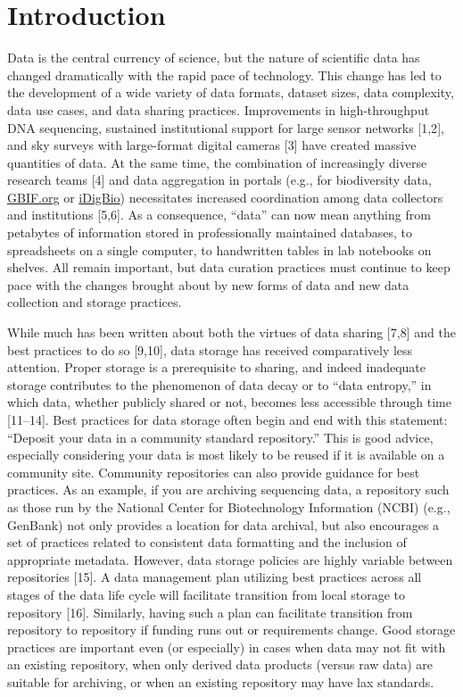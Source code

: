 \documentclass[10pt,letterpaper]{article}
\begin{document}
\section*{Introduction}\label{introduction}

Data is the central currency of science, but the nature of scientific
data has changed dramatically with the rapid pace of technology. This
change has led to the development of a wide variety of data formats,
dataset sizes, data complexity, data use cases, and data sharing
practices. Improvements in high-throughput DNA sequencing, sustained
institutional support for large sensor networks {[}1,2{]}, and sky
surveys with large-format digital cameras {[}3{]} have created massive
quantities of data. At the same time, the combination of increasingly
diverse research teams {[}4{]} and data aggregation in portals (e.g.,
for biodiversity data, \href{http://gbif.org/}{GBIF.org} or
\href{https://www.idigbio.org/portal/}{iDigBio}) necessitates increased
coordination among data collectors and institutions {[}5,6{]}. As a
consequence, ``data'' can now mean anything from petabytes of
information stored in professionally maintained databases, to
spreadsheets on a single computer, to handwritten tables in lab
notebooks on shelves. All remain important, but data curation practices
must continue to keep pace with the changes brought about by new forms
of data and new data collection and storage practices.

While much has been written about both the virtues of data sharing
{[}7,8{]} and the best practices to do so {[}9,10{]}, data storage has
received comparatively less attention. Proper storage is a prerequisite
to sharing, and indeed inadequate storage contributes to the phenomenon
of data decay or to ``data entropy,'' in which data, whether publicly
shared or not, becomes less accessible through time {[}11--14{]}. Best
practices for data storage often begin and end with this statement:
``Deposit your data in a community standard repository.'' This is good
advice, especially considering your data is most likely to be reused if
it is available on a community site. Community repositories can also
provide guidance for best practices. As an example, if you are archiving
sequencing data, a repository such as those run by the National Center
for Biotechnology Information (NCBI) (e.g., GenBank) not only provides a
location for data archival, but also encourages a set of practices
related to consistent data formatting and the inclusion of appropriate
metadata. However, data storage policies are highly variable between
repositories {[}15{]}. A data management plan utilizing best practices
across all stages of the data life cycle will facilitate transition from
local storage to repository {[}16{]}. Similarly, having such a plan can
facilitate transition from repository to repository if funding runs out
or requirements change. Good storage practices are important even (or
especially) in cases when data may not fit with an existing repository,
when only derived data products (versus raw data) are suitable for
archiving, or when an existing repository may have lax standards.
\end{document}
